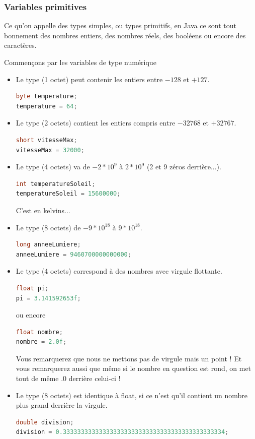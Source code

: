 \documentclass[a4paper,twoside]{article}
\begin{document}
\subsubsection{Variables primitives}
Ce qu'on appelle des types simples, ou types primitifs, en Java ce sont tout bonnement des nombres entiers, des nombres réels, des booléens ou encore des caractères. 

Commençons par les variables de type numérique
\begin{itemize}
\item Le type  (1 octet) peut contenir les entiers entre $-128$ et $+127$.
\begin{lstlisting}[language=java]
byte temperature;
temperature = 64;
\end{lstlisting}

\item Le type  (2 octets) contient les entiers compris entre $-32768$ et $+32767$.
\begin{lstlisting}[language=java]
short vitesseMax;
vitesseMax = 32000;
\end{lstlisting}

\item Le type  (4 octets) va de $-2*10^9$ à $2*10^9$ (2 et 9 zéros derrière...).
\begin{lstlisting}[language=java]
int temperatureSoleil;
temperatureSoleil = 15600000;
\end{lstlisting}
C'est en kelvins...

\item Le type (8 octets) de $-9*10^{18}$ à $9*10^{18}$.
\begin{lstlisting}[language=java]
long anneeLumiere;
anneeLumiere = 9460700000000000;
\end{lstlisting}

\item Le type  (4 octets) correspond à des nombres avec virgule flottante.
\begin{lstlisting}[language=java]
float pi;
pi = 3.141592653f;
\end{lstlisting}
ou encore
\begin{lstlisting}[language=java]
float nombre;
nombre = 2.0f;
\end{lstlisting}

Vous remarquerez que nous ne mettons pas de virgule mais un point ! Et vous remarquerez aussi que même si le nombre en question est rond, on met tout de même .0 derrière celui-ci !

\item Le type  (8 octets) est identique à float, si ce n'est qu'il contient un nombre plus grand derrière la virgule.
\begin{lstlisting}[language=java]
double division;
division = 0.333333333333333333333333333333333333333333334;
\end{lstlisting}
\end{itemize}
\end{document}
